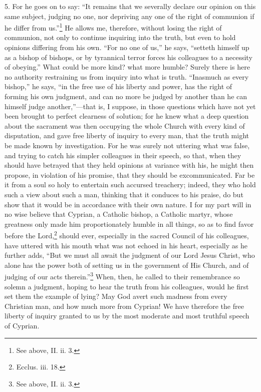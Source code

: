 5. For he goes on to say: ``It remains that we severally declare our opinion on this same subject, judging no one, nor depriving any one of the right of communion if he differ from us.''\footnote{\par  See above, II. ii. 3.} He allows me, therefore, without losing the right of communion, not only to continue inquiring into the truth, but even to hold opinions differing from his own. ``For no one of us,'' he says, ``setteth himself up as a bishop of bishops, or by tyrannical terror forces his colleagues to a necessity of obeying.'' What could be more kind? what more humble? Surely there is here no authority restraining us from inquiry into what is truth. ``Inasmuch as every bishop,'' he says, ``in the free use of his liberty and power, has the right of forming his own judgment, and can no more be judged by another than he can himself judge another,''—that is, I suppose, in those questions which have not yet been brought to perfect clearness of solution; for he knew what a deep question about the sacrament was then occupying the whole Church with every kind of disputation, and gave free liberty of inquiry to every man, that the truth might be made known by investigation. For he was surely not uttering what was false, and trying to catch his simpler colleagues in their speech, so that, when they should have betrayed that they held opinions at variance with his, he might then propose, in violation of his promise, that they should be excommunicated. Far be it from a soul so holy to entertain such accursed treachery; indeed, they who hold such a view about such a man, thinking that it conduces to his praise, do but show that it would be in accordance with their own nature. I for my part will in no wise believe that Cyprian, a Catholic bishop, a Catholic martyr, whose greatness only made him proportionately humble in all things, so as to find favor before the Lord,\footnote{\par  Ecclus. iii. 18.} should ever, especially in the sacred Council of his colleagues, have uttered with his mouth what was not echoed in his heart, especially as he further adds, ``But we must all await the judgment of our Lord Jesus Christ, who alone has the power both of setting us in the government of His Church, and of judging of our acts therein.''\footnote{\par  See above, II. ii. 3.} When, then, he called to their remembrance so solemn a judgment, hoping to hear the truth from his colleagues, would he first set them the example of lying? May God avert such madness from every Christian man, and how much more from Cyprian! We have therefore the free liberty of inquiry granted to us by the most moderate and most truthful speech of Cyprian.

